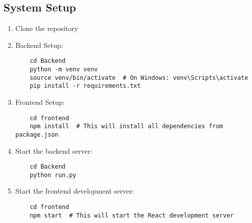 \documentclass[12pt,a4paper]{article}
\begin{document}
\subsection{System Setup}
\begin{enumerate}
    \item Clone the repository
    \item Backend Setup:
    \begin{lstlisting}
    cd Backend
    python -m venv venv
    source venv/bin/activate  # On Windows: venv\Scripts\activate
    pip install -r requirements.txt
    \end{lstlisting}
    \item Frontend Setup:
    \begin{lstlisting}
    cd frontend
    npm install  # This will install all dependencies from package.json
    \end{lstlisting}
    \item Start the backend server:
    \begin{lstlisting}
    cd Backend
    python run.py
    \end{lstlisting}
    \item Start the frontend development server:
    \begin{lstlisting}
    cd frontend
    npm start  # This will start the React development server
    \end{lstlisting}
\end{enumerate}
\end{document}
